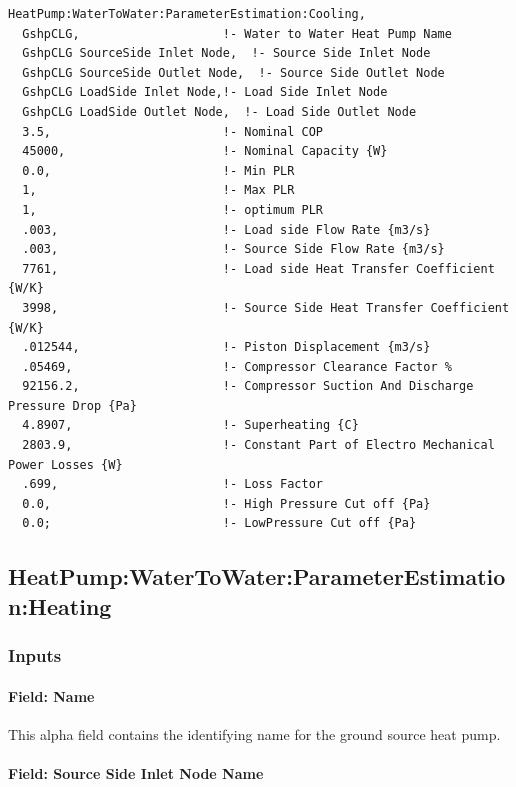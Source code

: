 \begin{lstlisting}
HeatPump:WaterToWater:ParameterEstimation:Cooling,
  GshpCLG,                    !- Water to Water Heat Pump Name
  GshpCLG SourceSide Inlet Node,  !- Source Side Inlet Node
  GshpCLG SourceSide Outlet Node,  !- Source Side Outlet Node
  GshpCLG LoadSide Inlet Node,!- Load Side Inlet Node
  GshpCLG LoadSide Outlet Node,  !- Load Side Outlet Node
  3.5,                        !- Nominal COP
  45000,                      !- Nominal Capacity {W}
  0.0,                        !- Min PLR
  1,                          !- Max PLR
  1,                          !- optimum PLR
  .003,                       !- Load side Flow Rate {m3/s}
  .003,                       !- Source Side Flow Rate {m3/s}
  7761,                       !- Load side Heat Transfer Coefficient {W/K}
  3998,                       !- Source Side Heat Transfer Coefficient {W/K}
  .012544,                    !- Piston Displacement {m3/s}
  .05469,                     !- Compressor Clearance Factor %
  92156.2,                    !- Compressor Suction And Discharge Pressure Drop {Pa}
  4.8907,                     !- Superheating {C}
  2803.9,                     !- Constant Part of Electro Mechanical Power Losses {W}
  .699,                       !- Loss Factor
  0.0,                        !- High Pressure Cut off {Pa}
  0.0;                        !- LowPressure Cut off {Pa}
\end{lstlisting}

\subsection{HeatPump:WaterToWater:ParameterEstimation:Heating}\label{heatpumpwatertowaterparameterestimationheating}

\subsubsection{Inputs}\label{inputs-15-010}

\paragraph{Field: Name}\label{field-name-14-006}

This alpha field contains the identifying name for the ground source heat pump.

\paragraph{Field: Source Side Inlet Node Name}\label{field-source-side-inlet-node-name-3}

